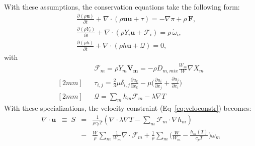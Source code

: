With these assumptions, the conservation equations take the following form:
\begin{eqnarray}
&&\frac{\partial (\rho \boldsymbol{u})}{\partial t} + 
\nabla \cdot \left(\rho  \boldsymbol{u} \boldsymbol{u} + \tau \right)
= -\nabla \pi + \rho \, \boldsymbol{F}  ,
\nonumber
\\
&&\frac{\partial (\rho Y_i)}{\partial t} +
\nabla \cdot \left( \rho Y_i \boldsymbol{u} + \boldsymbol{\mathcal{F}}_{i} \right)
= \rho \, \dot{\omega}_i,
\label{eq:pelelm}
\\
&&\frac{ \partial (\rho h)}{ \partial t} +
\nabla \cdot \left( \rho h \boldsymbol{u} + \boldsymbol{\mathcal{Q}} \right) = 0 ,
\nonumber
\end{eqnarray}
with
 \begin{eqnarray*}
&&\boldsymbol{\mathcal{F}}_{m} = \rho Y_m \boldsymbol{V_m} = - \rho D_{m,mix} \frac{W_m}{W}  \nabla X_m
\\ [2mm]
&&\tau_{i,j} = \frac{2}{3} \mu \delta_{i,j} \frac{\partial {u_k}}{\partial x_k} - \mu \Big(\frac{\partial  u_i}{\partial x_j} + \frac{\partial  u_j}{\partial x_i}\Big)
\\ [2mm]
&&\boldsymbol{\mathcal{Q}} =  \sum_m h_m \boldsymbol{\mathcal{F}}_{m}  - \lambda \nabla T
\end{eqnarray*}
With these specializations, the velocity constraint (Eq~\ref{eq:veloconstr}) becomes:
\begin{eqnarray}
\nabla \cdot \boldsymbol{u} \;\;  \equiv \; S&=& \frac{1}{\rho c_{p} T}(\nabla \cdot \lambda \nabla T - \sum_m  \boldsymbol{\mathcal{F}}_{m} \cdot \nabla h_m) \nonumber
\\
&-& \frac{W}{\rho} \sum_m \frac{1}{W_m} \nabla \cdot \boldsymbol{\mathcal{F}}_{m} + \frac{1}{\rho} \sum_m \Big( \frac{W}{W_m} -\frac{h_m(T)}{c_{p} T} \Big)\dot{\omega}_m
\label{eq:igldivu}
\end{eqnarray}



